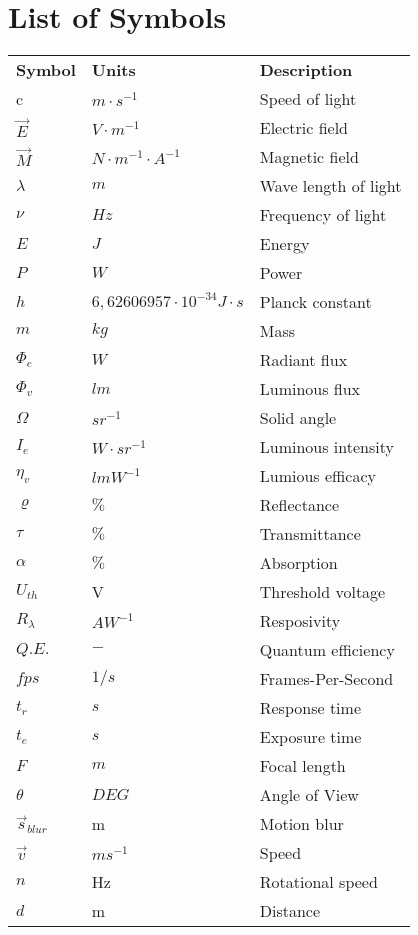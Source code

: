 \section*{List of Symbols}

\begin{longtable}[l]{p{150pt} p{150pt} p{200pt}}
\textbf{Symbol}	& \textbf{Units} & \textbf{Description} \\ 
c	& $m \cdot s^{-1} $	& Speed of light\\
$\vec{E}$	& $V\cdot m^{-1}$	& Electric field\\
$\vec{M}$	& $N\cdot m^{-1}\cdot A^{-1}$	& Magnetic field\\ 
$\lambda$	& $m$	& Wave length of light\\ 
$\nu$	& $Hz$	& Frequency of light\\ 
$E$ & $J$ 	& Energy\\
$P$ & $W$ & Power\\
$h$ & $6,626 069 57 \cdot 10^{-34} J\cdot s$ & Planck constant\\
$m$ & $kg$ & Mass\\
$\Phi _e$ & $W$ & Radiant flux\\
$\Phi _v$ & $lm$ & Luminous flux\\
$\Omega$ & $sr^{-1}$ &  Solid angle \\
$I_e$ & $W\cdot sr^{-1}$ & Luminous intensity \\
$\eta_v$ & $lmW^{-1}$ & Lumious efficacy\\
$\varrho$ & $\%$ & Reflectance\\
$\tau$ & $\%$ & Transmittance \\
$\alpha$ & $\%$ & Absorption \\
$U_{th}$ & V & Threshold voltage\\
$R_{\lambda}$  & $AW^{-1}$ & Resposivity \\ 
$Q.E.$ & $-$ & Quantum efficiency \\
$fps$ & $1/s$ & Frames-Per-Second\\
$t_r$ & $s$ & Response time \\
$t_e$ & $s$ & Exposure time \\
$F$ & $m$ & Focal length \\
$\theta$ & $DEG$ & Angle of View \\
$\vec{s}_{blur}$ & m & Motion blur\\
$\vec{v}$ & $ms^{-1}$ & Speed\\
$n$ & Hz & Rotational speed\\
$d$ & m & Distance\\

\end{longtable}
